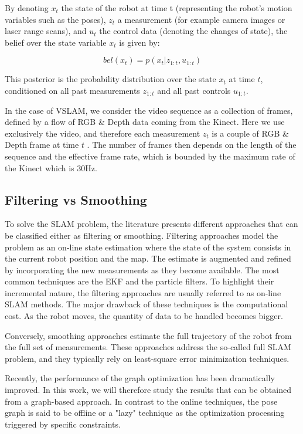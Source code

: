 By denoting $x_t$ the state of the robot at time t (representing the robot's motion variables such as the poses), $z_t$ a measurement (for example camera images or laser range scans), and $u_t$ the control data (denoting the changes of state), the belief over the state variable $x_t$ is given by:

\[bel(x_t) = p(x_t | z_{1:t}, u_{1:t})\]

This posterior is the probability distribution over the state $x_t$ at time $t$, conditioned on all past measurements $z_{1:t}$ and all past controls $u_{1:t}$.

In the case of \gls{VSLAM}, we consider the video sequence as a collection of frames, defined by a flow of RGB \& Depth data coming from the Kinect. Here we use exclusively the video, and therefore each measurement $z_t$ is a couple of RGB \& Depth frame at time $t$ . The number of frames then depends on the length of the sequence and the effective frame rate, which is bounded by the maximum rate of the Kinect which is 30Hz.


\subsection{Filtering vs Smoothing}

To solve the \gls{SLAM} problem, the literature presents different approaches that can be classified either as filtering or smoothing. Filtering approaches model the problem as an on-line state estimation where the state of the system consists in the current robot position and the map. The estimate is augmented and refined by incorporating the new measurements as they become available.
The most common techniques are the \gls{EKF} and the particle filters. To highlight their incremental nature, the filtering approaches are usually referred to as on-line \gls{SLAM} methods.
The major drawback of these techniques is the computational cost. As the robot moves, the quantity of data to be handled becomes bigger.

Conversely, smoothing approaches estimate the full trajectory of the robot from the full set of measurements. These approaches address the so-called full \gls{SLAM} problem, and they typically rely on least-square error minimization techniques.

Recently, the performance of the graph optimization has been dramatically improved. In this work, we will therefore study the results that can be obtained from a graph-based approach. In contrast to the online techniques, the pose graph is said to be offline or a "lazy" technique as the optimization processing triggered by specific constraints.

